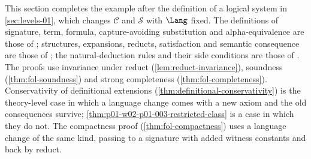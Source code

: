 This section completes the example after the definition of a logical system
in \cref{sec:levels-01}, which changes \(\mathcal C\) and \(\mathcal S\)
with \(\Lang\) fixed. The definitions of signature, term, formula,
capture-avoiding substitution and alpha-equivalence are those of
\cite[ch.~``First-Order Syntax'']{FrozenFormalLogicLanguageChange}; structures,
expansions, reducts, satisfaction and semantic consequence are those of
\cite[ch.~``Structures, Satisfaction, and
Translation'']{FrozenFormalLogicLanguageChange}; the natural-deduction rules and
their side conditions are those of \cite[ch.~``First-Order Deduction'',
section ``Natural-deduction rules for quantifiers and
equality'']{FrozenFormalLogicLanguageChange}. The proofs use invariance under
reduct (\cref{lem:reduct-invariance}), soundness
(\cref{thm:fol-soundness}) and strong completeness
(\cref{thm:fol-completeness}). Conservativity of definitional extensions
(\cref{thm:definitional-conservativity}) is the theory-level case in which a
language change comes with a new axiom and the old consequences survive;
\cref{thm:p01-w02-p01-003-restricted-class} is a case in which they do not.
The compactness proof (\cref{thm:fol-compactness}) uses a language change of
the same kind, passing to a signature with added witness constants and back
by reduct.

